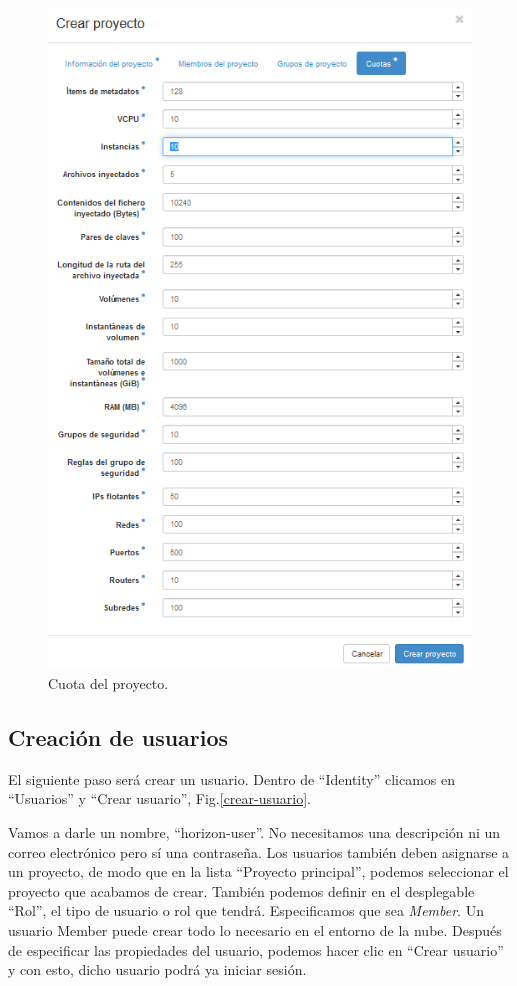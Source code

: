\begin{figure}
    \centering
    \includegraphics[width=1\textwidth]{imagenes/capitulo6/crear-proyecto-2.PNG}
    \caption{Cuota del proyecto.}
	\vspace{0.3cm}
    \label{crear-proyecto-2}
\end{figure}

\subsection{Creación de usuarios}
El siguiente paso será crear un usuario. Dentro de “Identity” clicamos en “Usuarios” y “Crear usuario”, Fig.\ref{crear-usuario}.

Vamos a darle un nombre, “horizon-user”. No necesitamos una descripción ni un correo electrónico pero sí una contraseña. Los usuarios también deben asignarse a un proyecto, de modo que en la lista “Proyecto principal”, podemos seleccionar el proyecto que acabamos de crear. También podemos definir en el desplegable “Rol”, el tipo de usuario o rol que tendrá. Especificamos que sea \textit{Member}. Un usuario Member puede crear todo lo necesario en el entorno de la nube. Después de especificar las propiedades del usuario, podemos hacer clic en “Crear usuario” y con esto, dicho usuario podrá ya iniciar sesión.

